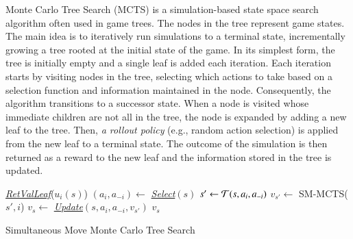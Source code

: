 Monte Carlo Tree Search (MCTS) is a simulation-based state space search algorithm often used
in game trees. The nodes in the tree represent game states. The main idea is to iteratively run
simulations to a terminal state, incrementally growing a tree rooted at the initial state of the game. In
its simplest form, the tree is initially empty and a single leaf is added each iteration. Each iteration
starts by visiting nodes in the tree, selecting which actions to take based on a selection function and
information maintained in the node. Consequently, the algorithm transitions to a successor state. When a
node is visited whose immediate children are not all in the tree, the node is expanded by adding a
new leaf to the tree. Then, \emph{a rollout policy} (e.g., random action selection) is applied from the new
leaf to a terminal state. The outcome of the simulation is then returned as a reward to the new leaf
and the information stored in the tree is updated.

\begin{algorithm2e}[t]
\small
{}
 {
	\Return \emph{\underline{RetValLeaf}}($u_i(s)$)
}
 {
	$(a_i, a_{-i}) \leftarrow$ \emph{\underline{Select}}$(s)$\;\label{alg:smmcts:select}
	$s' \leftarrow \mathcal{T}(s,a_i,a_{-i})$\;
	$v_{s'} \leftarrow $ SM-MCTS($s',i$)\;
	$v_{s} \leftarrow$ \emph{\underline{Update}}$(s,a_i,a_{-i},v_{s'})$\;\label{alg:smmcts:up}
	\Return $v_{s}$
}

\caption{Simultaneous Move Monte Carlo Tree Search}\label{alg:smmmcts}
\end{algorithm2e}

